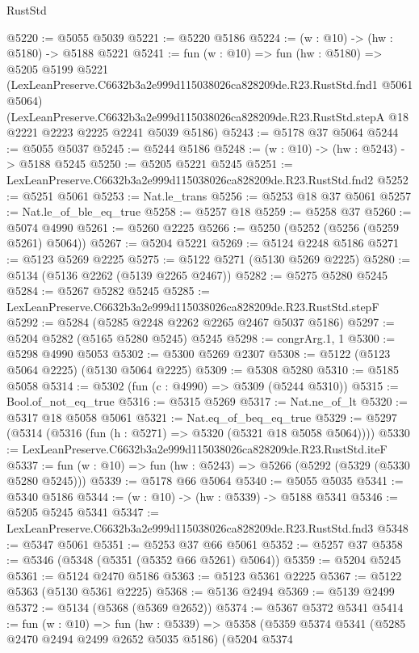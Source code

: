 \begin{lexlean}{RustStd}
\begin{coremodule}
@5220 := @5055 @5039
@5221 := @5220 @5186
@5224 := (w : @10) -> (hw : @5180) -> @5188 @5221
@5241 := fun (w : @10) =>
  fun (hw : @5180) =>
  @5205
    @5199
    @5221
    (LexLeanPreserve.C6632b3a2e999d115038026ca828209de.R23.RustStd.fnd1 @5061 @5064)
    (LexLeanPreserve.C6632b3a2e999d115038026ca828209de.R23.RustStd.stepA
      @18
      @2221
      @2223
      @2225
      @2241
      @5039
      @5186)
@5243 := @5178 @37 @5064
@5244 := @5055 @5037
@5245 := @5244 @5186
@5248 := (w : @10) -> (hw : @5243) -> @5188 @5245
@5250 := @5205 @5221 @5245
@5251 := LexLeanPreserve.C6632b3a2e999d115038026ca828209de.R23.RustStd.fnd2
@5252 := @5251 @5061
@5253 := Nat.le_trans
@5256 := @5253 @18 @37 @5061
@5257 := Nat.le_of_ble_eq_true
@5258 := @5257 @18
@5259 := @5258 @37
@5260 := @5074 @4990
@5261 := @5260 @2225
@5266 := @5250 (@5252 (@5256 (@5259 @5261) @5064))
@5267 := @5204 @5221
@5269 := @5124 @2248 @5186
@5271 := @5123 @5269 @2225
@5275 := @5122 @5271 (@5130 @5269 @2225)
@5280 := @5134 (@5136 @2262 (@5139 @2265 @2467))
@5282 := @5275 @5280 @5245
@5284 := @5267 @5282 @5245
@5285 := LexLeanPreserve.C6632b3a2e999d115038026ca828209de.R23.RustStd.stepF
@5292 := @5284 (@5285 @2248 @2262 @2265 @2467 @5037 @5186)
@5297 := @5204 @5282 (@5165 @5280 @5245) @5245
@5298 := congrArg.{1, 1}
@5300 := @5298 @4990 @5053
@5302 := @5300 @5269 @2307
@5308 := @5122 (@5123 @5064 @2225) (@5130 @5064 @2225)
@5309 := @5308 @5280
@5310 := @5185 @5058
@5314 := @5302 (fun (c : @4990) => @5309 (@5244 @5310))
@5315 := Bool.of_not_eq_true
@5316 := @5315 @5269
@5317 := Nat.ne_of_lt
@5320 := @5317 @18 @5058 @5061
@5321 := Nat.eq_of_beq_eq_true
@5329 := @5297 (@5314 (@5316 (fun (h : @5271) => @5320 (@5321 @18 @5058 @5064))))
@5330 := LexLeanPreserve.C6632b3a2e999d115038026ca828209de.R23.RustStd.iteF
@5337 := fun (w : @10) => fun (hw : @5243) => @5266 (@5292 (@5329 (@5330 @5280 @5245)))
@5339 := @5178 @66 @5064
@5340 := @5055 @5035
@5341 := @5340 @5186
@5344 := (w : @10) -> (hw : @5339) -> @5188 @5341
@5346 := @5205 @5245 @5341
@5347 := LexLeanPreserve.C6632b3a2e999d115038026ca828209de.R23.RustStd.fnd3
@5348 := @5347 @5061
@5351 := @5253 @37 @66 @5061
@5352 := @5257 @37
@5358 := @5346 (@5348 (@5351 (@5352 @66 @5261) @5064))
@5359 := @5204 @5245
@5361 := @5124 @2470 @5186
@5363 := @5123 @5361 @2225
@5367 := @5122 @5363 (@5130 @5361 @2225)
@5368 := @5136 @2494
@5369 := @5139 @2499
@5372 := @5134 (@5368 (@5369 @2652))
@5374 := @5367 @5372 @5341
@5414 := fun (w : @10) =>
  fun (hw : @5339) =>
  @5358
    (@5359
      @5374
      @5341
      (@5285 @2470 @2494 @2499 @2652 @5035 @5186)
      (@5204
        @5374

\end{coremodule}
\end{lexlean}
